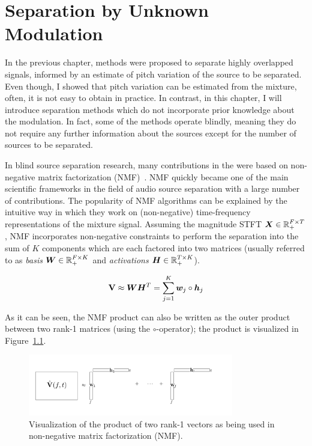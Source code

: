 \chapter{Separation by Unknown Modulation}
\label{cha:unknown}

In the previous chapter, methods were proposed to separate highly overlapped signals, informed by an estimate of pitch variation of the source to be separated.
Even though, I showed that pitch variation can be estimated from the mixture, often, it is not easy to obtain in practice.
In contrast, in this chapter, I will introduce separation methods which do not incorporate prior knowledge about the modulation. 
In fact, some of the methods operate blindly, meaning they do not require any further information about the sources except for the number of sources to be separated.
\par
In blind source separation research, many contributions in the were based on non-negative matrix factorization (NMF)~\cite{lee99, lee01}.
NMF quickly became one of the main scientific frameworks in the field of audio source separation with a large number of contributions.
The popularity of NMF algorithms can be explained by the intuitive way in which they work on (non-negative) time-frequency representations of the mixture signal.
Assuming the magnitude STFT \({\bm{X}} \in {\mathbb{R}}_{+}^{F \times T}\), NMF incorporates non-negative constraints to perform the separation into the sum of \(K\) components which are each factored into two matrices (usually referred to as \emph{basis} \({\bm{W}} \in {\mathbb{R}}_{+}^ { F \times K }\) and \emph{activations} \({\bm{H}} \in {\mathbb{R}}_{+}^ { T \times K }\)). 

\begin{equation}
   \mathbf{V} \approx {\bm{W}} {\bm{H}}^{T} = \sum\limits_{j=1}^{K} {\bm{w}}_{j} \circ {\bm{h}}_{j} 
   \label{eq:vanilla_nmf}
\end{equation}

As it can be seen, the NMF product can also be written as the outer product between two rank-1 matrices (using the \(\circ\)-operator); the product is visualized in Figure~\ref{fig:nmf}.

\begin{figure}[h]
  \centering
  \includegraphics[width=0.8\textwidth]{Chapters/06_Separation_Unknown/figures/nmf.pdf}
  \caption{Visualization of the product of two rank-1 vectors as being used in non-negative matrix factorization (NMF).}
  \label{fig:nmf}
\end{figure}


